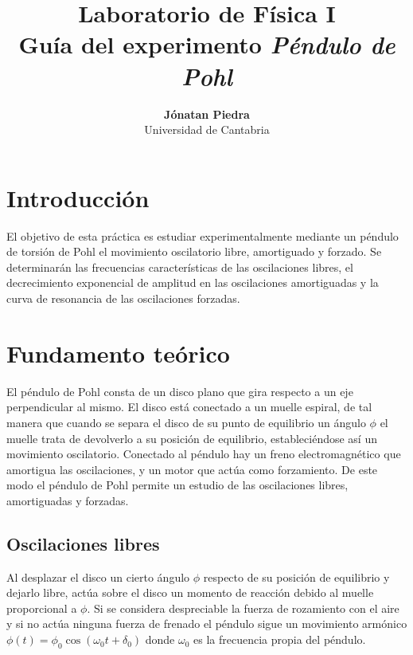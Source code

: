 \documentclass[11pt]{articulo}
\begin{document}
\title{\bf Laboratorio de F\'isica I\\
  Gu\'ia del experimento \emph{P\'endulo de Pohl}}
\author{
  {\bf J\'onatan Piedra}\\
  Universidad de Cantabria}
\maketitle


\section{Introducci\'on}

El objetivo de esta pr\'actica es estudiar experimentalmente mediante un p\'endulo de torsi\'on de Pohl el movimiento oscilatorio libre, amortiguado y forzado. Se determinar\'an las frecuencias caracter\'isticas de las oscilaciones libres, el decrecimiento exponencial de amplitud en las oscilaciones amortiguadas y la curva de resonancia de las oscilaciones forzadas.


\section{Fundamento te\'orico}

El p\'endulo de Pohl consta de un disco plano que gira respecto a un eje perpendicular al mismo. El disco est\'a conectado a un muelle espiral, de tal manera que cuando se separa el disco de su punto de equilibrio un \'angulo $\phi$ el muelle trata de devolverlo a su posici\'on de equilibrio, estableci\'endose as\'i un movimiento oscilatorio. Conectado al p\'endulo hay un freno electromagn\'etico que amortigua las oscilaciones, y un motor que act\'ua como forzamiento. De este modo el p\'endulo de Pohl permite un estudio de las oscilaciones libres, amortiguadas y forzadas.

\subsection{Oscilaciones libres}

Al desplazar el disco un cierto \'angulo $\phi$ respecto de su posici\'on de equilibrio y dejarlo libre, act\'ua sobre el disco un momento de reacci\'on debido al muelle proporcional a $\phi$. Si se considera despreciable la fuerza de rozamiento con el aire y si no act\'ua ninguna fuerza de frenado el p\'endulo sigue un movimiento arm\'onico $\phi (t) = \phi_0 \cos (\omega_0 t + \delta_0)$ donde $\omega_0$ es la frecuencia propia del p\'endulo.
\end{document}
